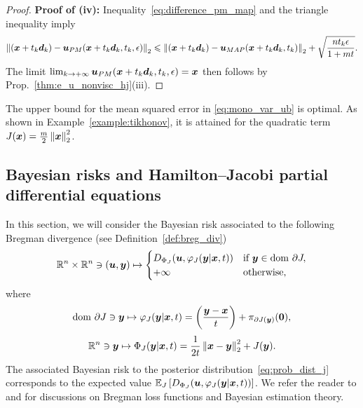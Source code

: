 \begin{proof}
\textbf{Proof of (iv):} Inequality~\eqref{eq:difference_pm_map} and the triangle inequality imply
\begin{equation*}
\left\Vert (\boldsymbol{x} + t_k\boldsymbol{d}_k)- \boldsymbol{u}_{PM}(\boldsymbol{x} + t_k\boldsymbol{d}_k,t_k,\epsilon)\right\Vert_{2} \leqslant \left\Vert (\boldsymbol{x} + t_k\boldsymbol{d}_k) - \boldsymbol{u}_{MAP}(\boldsymbol{x} + t_k\boldsymbol{d}_k,t_k)\right\Vert_{2} + \sqrt{\frac{nt_k\epsilon}{1+mt}}.
\end{equation*}
The limit $\lim_{k \to +\infty} \boldsymbol{u}_{PM}(\boldsymbol{x} + t_k\boldsymbol{d}_k,t_k,\epsilon) = \boldsymbol{x}$ then follows by Prop.~\ref{thm:e_u_nonvisc_hj}(iii).
\end{proof}

\begin{rem}
The upper bound for the mean squared error in \eqref{eq:mono_var_ub} is optimal. As shown in Example~\ref{example:tikhonov}, it is attained for the quadratic term $J(\boldsymbol{x}) = \frac{m}{2}\left\Vert{\boldsymbol{x}} \right\Vert_{2}^{2}$. 
\end{rem}

\subsection{Bayesian risks and Hamilton--Jacobi partial differential equations} \label{subsec:prop_breg_div}

In this section, we will consider the Bayesian risk associated to the following Bregman divergence (see Definition~\ref{def:breg_div})
\begin{equation}\label{eq:breg2}
\mathbb{R}^n\times\mathbb{R}^n \ni (\boldsymbol{u}, \boldsymbol{y}) \mapsto
\begin{cases}
D_{\Phi_{J}}(\boldsymbol{u},\varphi_{J}(\boldsymbol{y}|\boldsymbol{x},t)) & \text{if } \boldsymbol{y} \in \mathrm{dom~} \partial J,\\
+\infty & \text{otherwise,}
\end{cases}
\end{equation}
where 
\begin{equation*}
    \mathrm{dom~}\partial J \ni \boldsymbol{y} \mapsto \varphi_J(\boldsymbol{y}|\boldsymbol{x},t) = \left(\frac{\boldsymbol{y}-\boldsymbol{x}}{t}\right) + \pi_{\partial J(\boldsymbol{y})}(\boldsymbol{0}),
\end{equation*}
\[
\mathbb{R}^n \ni \boldsymbol{y} \mapsto \Phi_J(\boldsymbol{y}|\boldsymbol{x},t) = \frac{1}{2t}\left\Vert{\boldsymbol{x}-\boldsymbol{y}} \right\Vert_{2}^{2} + J(\boldsymbol{y}).
\]
The associated Bayesian risk to the posterior distribution~\eqref{eq:prob_dist_j} corresponds to the expected value $\mathbb{E}_{J}\left [{D_{\Phi_{J}}(\boldsymbol{u},\varphi_{J}(\boldsymbol{y}|\boldsymbol{x},t))}\right]$. We refer the reader to \cite{banerjee2005optimality} and \cite{keener2011theoretical} for discussions on Bregman loss functions and Bayesian estimation theory.

